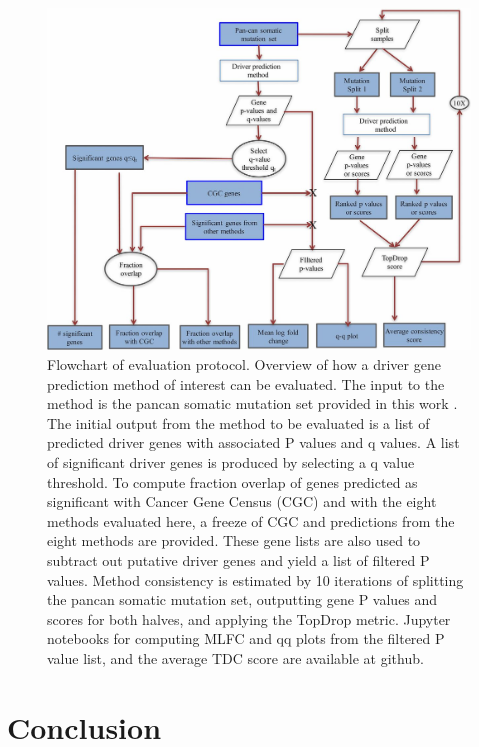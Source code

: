 \begin{figure}
  \centering
  \makeatletter
  \let\@currsize\normalsize
  \includegraphics[width=0.9\linewidth]{figures/chapter4/flow_chart.jpg}
  \caption{Flowchart of evaluation protocol. Overview of how a driver gene prediction method of interest can be evaluated. The input to the method is the pancan somatic mutation set provided in this work \cite{RN70}. The initial output from the method to be evaluated is a list of predicted driver genes with associated P values and q values. A list of significant driver genes is produced by selecting a q value threshold. To compute fraction overlap of genes predicted as significant with Cancer Gene Census (CGC) and with the eight methods evaluated here, a freeze of CGC and predictions from the eight methods are provided. These gene lists are also used to subtract out putative driver genes and yield a list of filtered P values. Method consistency is estimated by 10 iterations of splitting the pancan somatic mutation set, outputting gene P values and scores for both halves, and applying the TopDrop metric. Jupyter notebooks for computing MLFC and qq plots from the filtered P value list, and the average TDC score are available at github.}
  \label{fig:flow_chart}
\end{figure}

\section{Conclusion}

